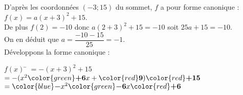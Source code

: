 \documentclass[a4paper,11pt,exos]{nsi} %
\begin{document}
D'après les coordonnées $(-3;15)$ du sommet, $f$ a pour forme canonique : $f(x)=a(x+3)^2+15$.\\
De plus $f(2)=-10$ donc $a(2+3)^2+15=-10$ soit $25a +15=-10$.\\
On en déduit que $a=\dfrac{-10-15}{25}=-1$.\\
Développons la forme canonique :
\begin{tabbing}
    $f(x)$  \= $ =-(x+3)^2+15$\\
    \>  $=-(x^2{\color{green}\boldsymbol{+6}}x+{\color{red}\boldsymbol{9}}){\color{red}\boldsymbol{+15}}$\\
    \>  $={\color{blue}\boldsymbol{-}}x^2{\color{green}\boldsymbol{-6}}x{\color{red}\boldsymbol{+6}}$
\end{tabbing} 
  
\end{document}

